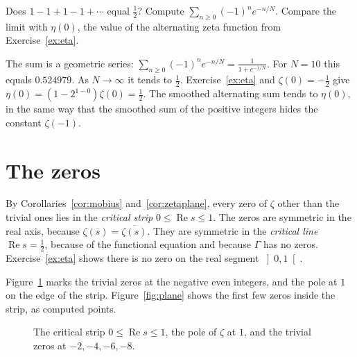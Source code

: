 \begin{think}
Does $1-1+1-1+\cdots$ equal $\frac12$? Compute $\sum_{n\ge0}(-1)^ne^{-n/N}$. Compare the limit with $\eta(0)$, the value of the alternating zeta function from Exercise~\ref{ex:eta}.
\end{think}

The sum is a geometric series: $\sum_{n\ge0}(-1)^ne^{-n/N}=\frac1{1+e^{-1/N}}$. For $N=10$ this equals $0.524979$. As $N\to\infty$ it tends to $\frac12$. Exercise~\ref{ex:eta} and $\zeta(0)=-\frac12$ give $\eta(0)=(1-2^{1-0})\zeta(0)=\frac12$. The smoothed alternating sum tends to $\eta(0)$, in the same way that the smoothed sum of the positive integers hides the constant $\zeta(-1)$.

\section{The zeros}

By Corollaries~\ref{cor:mobius} and~\ref{cor:zetaplane}, every zero of $\zeta$ other than the trivial ones lies in the \emph{critical strip} $0\le\operatorname{Re}s\le1$. The zeros are symmetric in the real axis, because $\zeta(\overline s)=\overline{\zeta(s)}$. They are symmetric in the \emph{critical line} $\operatorname{Re}s=\frac12$, because of the functional equation and because $\Gamma$ has no zeros. Exercise~\ref{ex:eta} shows there is no zero on the real segment $\left]0,1\right[$.

Figure~\ref{fig:rw10-strip} marks the trivial zeros at the negative even integers, and the pole at $1$ on the edge of the strip. Figure~\ref{fig:plane} shows the first few zeros inside the strip, as computed points.

\begin{figure}[ht]
\centering
{}
\caption{The critical strip $0\le\operatorname{Re}s\le1$, the pole of $\zeta$ at $1$, and the trivial zeros at $-2,-4,-6,-8$.}
\label{fig:rw10-strip}
\end{figure}

